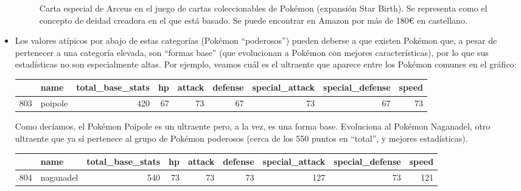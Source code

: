 \documentclass[
  12pt,
]{extreport}
\begin{document}
\begin{itemize}
\begin{figure}[H]
{  }

  \caption{Carta especial de Arceus en el juego de cartas coleccionables
  de Pokémon (expansión Star Birth). Se representa como el concepto de
  deidad creadora en el que está basado. Se puede encontrar en Amazon
  por más de 180€ en castellano.}

  \end{figure}%
\item
  Los valores atípicos por abajo de estas categorías (Pokémon
  ``poderosos'') pueden deberse a que existen Pokémon que, a pesar de
  pertenecer a una categoría elevada, son ``formas base'' (que
  evolucionan a Pokémon con mejores características), por lo que sus
  estadísticas no son especialmente altas. Por ejemplo, veamos cuál es
  el ultraente que aparece entre los Pokémon comunes en el gráfico:

  \begin{table}[H]
  \centering\begingroup\fontsize{9.5}{11.5}\selectfont

  \begin{tabular}{llrrrrrrr}
  \toprule
    & name & total\_base\_stats & hp & attack & defense & special\_attack & special\_defense & speed\\
  \midrule
  803 & poipole & 420 & 67 & 73 & 67 & 73 & 67 & 73\\
  \bottomrule
  \end{tabular}
  \endgroup{}
  \end{table}

  Como decíamos, el Pokémon Poipole es un ultraente pero, a la vez, es
  una forma base. Evoluciona al Pokémon Naganadel, otro ultraente que ya
  sí pertenece al grupo de Pokémon poderosos (cerca de los 550 puntos en
  ``total'', y mejores estadísticas).

  \begin{table}[H]
  \centering\begingroup\fontsize{9.5}{11.5}\selectfont

  \begin{tabular}{llrrrrrrr}
  \toprule
    & name & total\_base\_stats & hp & attack & defense & special\_attack & special\_defense & speed\\
  \midrule
  804 & naganadel & 540 & 73 & 73 & 73 & 127 & 73 & 121\\
  \bottomrule
  \end{tabular}
  \endgroup{}
  \end{table}

  \begin{figure}[H]


\end{figure}
\end{itemize}
\end{document}
